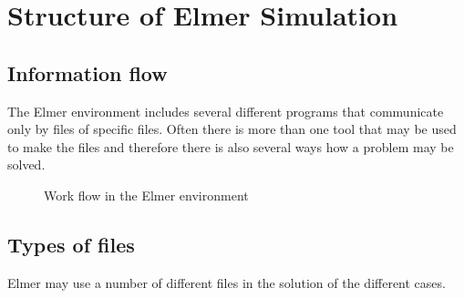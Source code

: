 \appendix
\chapter{Structure of Elmer Simulation}



\section{Information flow}

The Elmer environment includes several different programs that 
communicate only by files of specific files. Often there is
more than one tool that may be used to make the files and 
therefore there is also several ways how a problem may be solved.




\begin{figure}[tbhp]
\vspace{10mm}
\begin{center}
\caption{Work flow in the Elmer environment}
\end{center}
\end{figure}


\section{Types of files}

Elmer may use a number of different files in the solution of the
different cases.

